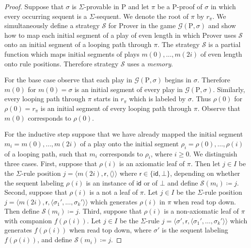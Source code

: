 \documentclass{myifcolog}
\newcommand{\hickp}{\mathrm{P}}
\numberwithin{theorem}{section}
\begin{document}
	\begin{proof}
	 Suppose that $\sigma$ is $\Sigma$-provable in $\hickp$ and let $\pi$ be a $\hickp$-proof of $\sigma$ in which every occurring sequent is a $\Sigma$-sequent. We denote the root of $\pi$ by $r_\pi$. We simultaneously define a strategy $\mathcal{S}$ for Prover in the game $\mathscr{G}(\hickp,\sigma)$ and show how to map each initial segment of a play of even length in which Prover uses $\mathcal{S}$ onto an initial segment of a looping path through $\pi$. The strategy $\mathcal{S}$ is a partial function which maps initial segments of plays $ m(0),\ldots, m(2i) $ of even length onto rule positions. Therefore strategy $\mathcal{S}$ uses a \emph{memory}.\smallskip
	 
	 For the base case observe that each play in $\mathscr{G}(\hickp,\sigma)$ begins in $\sigma$. Therefore $ m(0)$ for $m(0)= \sigma$ is an initial segment of every play in $\mathscr{G}(\hickp,\sigma)$. Similarly, every looping path through $\pi$ starts in $r_\pi$ which is labeled by $\sigma$. Thus $ \rho(0)$ for $\rho(0) = r_\pi$ is an initial segment of every looping path through $\pi$. Observe that $ m(0) $ corresponds to $ \rho(0)$.\smallskip
	 
	 For the inductive step suppose that we have already mapped the initial segment $m_i =  m(0), \ldots, m(2i)$ of a play onto the initial segment $\rho_i =  \rho(0),  \ldots, \rho(i)$ of a looping path, such that $m_i$ corresponds to $\rho_i$, where $i \geq 0$. We distinguish three cases. First, suppose that $\rho(i)$ is an axiomatic leaf of $\pi$. Then let $j \in I$ be the $\Sigma$-rule position $j=\langle m(2i), \mathsf{r}, \langle \rangle \rangle$ where $\mathsf{r} \in \{\mathsf{id, \bot}\}$, depending on whether the sequent labeling $\rho(i)$ is an instance of $\mathsf{id}$ or of $\bot$ and define $\mathcal{S}(m_i) \coloneqq j$. Second, suppose that $\rho(i)$ is a not a leaf of $\pi$. Let $j \in I$ be the $\Sigma$-rule position $j = \langle m(2i), \mathsf{r}, \langle \sigma_1', \ldots, \sigma_k' \rangle\rangle$ which generates $\rho(i)$ in $\pi$ when read top down. Then define $\mathcal{S}(m_i) \coloneqq j$. Third, suppose that $\rho(i)$ is a non-axiomatic leaf of $\pi$ with companion $f(\rho(i))$. Let $j \in I$ be the $\Sigma$-rule $j = \langle \sigma', \mathsf{r}, \langle \sigma_1', \ldots, \sigma_k' \rangle\rangle$ which generates $f(\rho(i))$ when read top down, where $\sigma'$ is the sequent labeling $f(\rho(i))$, and define $\mathcal{S}(m_i) \coloneqq j$.
	

\end{proof}
\end{document}
